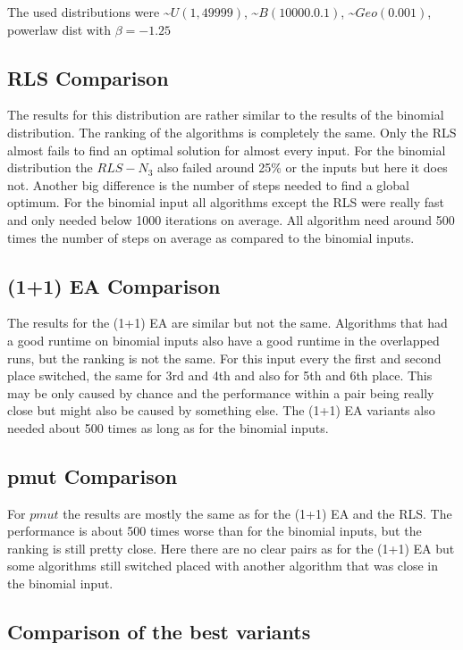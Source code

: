 The used distributions were \textasciitilde$U(1,49999)$, \textasciitilde$B(10000.0.1)$, \textasciitilde$Geo(0.001)$, powerlaw dist with $\beta=-1.25$
\subsection{RLS Comparison}




The results for this distribution are rather similar to the results of the binomial distribution.
The ranking of the algorithms is completely the same.
Only the RLS almost fails to find an optimal solution for almost every input.
For the binomial distribution the $RLS-N_3$ also failed around 25\% or the inputs but here it does not.
Another big difference is the number of steps needed to find a global optimum.
For the binomial input all algorithms except the RLS were really fast and only needed below 1000 iterations on average.
All algorithm need around 500 times the number of steps on average as compared to the binomial inputs.
\subsection{(1+1) EA Comparison}




The results for the (1+1) EA are similar but not the same.
Algorithms that had a good runtime on binomial inputs also have a good runtime in the overlapped runs, but the ranking is not the same.
For this input every the first and second place switched, the same for 3rd and 4th and also for 5th and 6th place.
This may be only caused by chance and the performance within a pair being really close but might also be caused by something else.
The (1+1) EA variants also needed about 500 times as long as for the binomial inputs.
\subsection{pmut Comparison}




For $pmut$ the results are mostly the same as for the (1+1) EA and the RLS.
The performance is about 500 times worse than for the binomial inputs, but the ranking is still pretty close.
Here there are no clear pairs as for the (1+1) EA but some algorithms still switched placed with another algorithm that was close in the binomial input.
\subsection{Comparison of the best variants}


